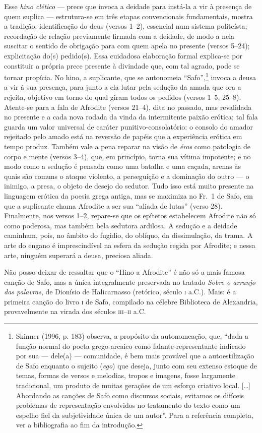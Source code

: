 {\small Esse \textit{hino clético} --- prece que invoca a deidade para instá-la a vir à
presença de quem suplica --- estrutura-se em três etapas convencionais
fundamentais, mostra a tradição: identificação do deus (versos 1--2), essencial
num sistema politeísta; recordação de relação previamente firmada com a
deidade, de modo a nela suscitar o sentido de obrigação para com quem apela no
presente (versos 5--24); explicitação do(s) pedido(s). Essa cuidadosa elaboração
formal explica-se por constituir a própria prece presente à divindade que, com
tal agrado, pode se tornar propícia. No hino, a suplicante, que se autonomeia
“Safo”,\footnote{ Skinner (1996, p. 183) observa, a propósito da autonomeação,
que, “dada a função normal do poeta grego arcaico como falante-representante
indicado por sua --- dele(a) --- comunidade, é bem mais provável que a
autoestilização de Safo enquanto o sujeito (\textit{ego}) que deseja, junto com
seu extenso estoque de temas, formas de versos e melodias, tropos e imagens,
fosse largamente tradicional, um produto de muitas gerações de um esforço
criativo local. [\ldots{}] Abordando as canções de Safo como discursos sociais,
evitamos os difíceis problemas de representação envolvidos no tratamento do
texto como um espelho fiel da subjetividade única de um autor”. Para a
referência completa, ver a bibliografia ao fim da introdução.} invoca a deusa
a vir à sua presença, para junto a ela lutar pela sedução da amada que ora a
rejeita, objetivo em torno do qual giram todos os pedidos (versos 1--5, 25--8).
Atente-se para a fala de Afrodite (versos 21--4), dita no passado, mas
revalidada no presente e a cada nova rodada da vinda da intermitente paixão
erótica; tal fala guarda um valor universal de caráter punitivo-consolatório: o
consolo do amador rejeitado pelo amado está na reversão de papéis que a
experiência erótica em tempo produz. Também vale a pena reparar na visão de
\textit{éros} como patologia de corpo e mente (versos 3--4), que, em princípio,
torna sua vítima impotente; e no modo como a sedução é pensada como uma batalha
e uma caçada, arenas às quais são comuns o ataque violento, a perseguição e a
dominação do outro --- o inimigo, a presa, o objeto de desejo do sedutor. Tudo
isso está muito presente na linguagem erótica da poesia grega antiga, mas se
maximiza no Fr.~1 de Safo, em que a suplicante chama Afrodite a ser sua
“aliada de lutas” (verso 28). Finalmente, nos versos 1--2, repare-se
que os epítetos estabelecem Afrodite não só como poderosa, mas também bela
sedutora ardilosa. A sedução e a deidade caminham, pois, no âmbito do fugidio,
do oblíquo, da dissimulação, da trama. A arte do engano é imprescindível na
esfera da sedução regida por Afrodite; e nessa arte, ninguém superará a deusa,
preciosa aliada.

Não posso deixar de ressaltar que o “Hino a Afrodite” é não só
a mais famosa canção de Safo, mas a única integralmente preservada no tratado
\textit{Sobre o arranjo das palavras}, de Dionísio de Halicarnasso (retórico,
século \textsc{i} a.C.). Mais: é a primeira canção do livro \textsc{i} de Safo,
compilado na célebre Biblioteca de Alexandria, provavelmente na virada dos
séculos \textsc{iii}--\textsc{ii} a.C.}

